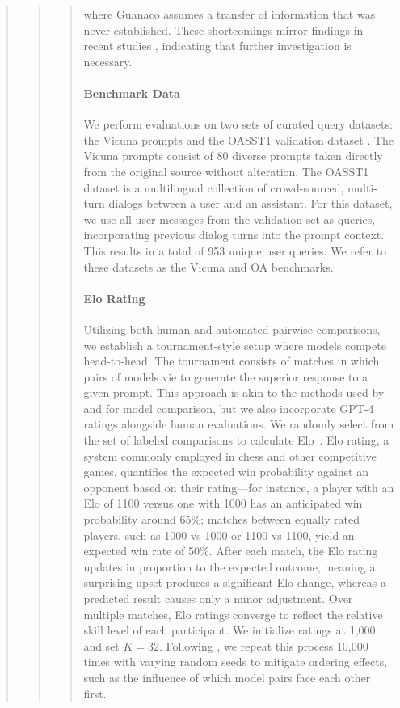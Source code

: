 \begin{quote}
\begin{quote}
\begin{quote}
where {Guanaco} assumes a transfer of information that was never established. These shortcomings mirror findings in recent studies \cite{sap2022neural}, indicating that further investigation is necessary.

\paragraph{Benchmark Data} We perform evaluations on two sets of curated query datasets: the Vicuna prompts \citep{vicuna2023} and the OASST1 validation dataset \citep{kopf2023openassistant}. The Vicuna prompts consist of 80 diverse prompts taken directly from the original source without alteration. The OASST1 dataset is a multilingual collection of crowd-sourced, multi-turn dialogs between a user and an assistant. For this dataset, we use all user messages from the validation set as queries, incorporating previous dialog turns into the prompt context. This results in a total of 953 unique user queries. We refer to these datasets as the Vicuna and OA benchmarks.

\paragraph{Elo Rating} Utilizing both human and automated pairwise comparisons, we establish a tournament-style setup where models compete head-to-head. The tournament consists of matches in which pairs of models vie to generate the superior response to a given prompt. This approach is akin to the methods used by \citet{bai2022training} and \citet{vicuna2023} for model comparison, but we also incorporate GPT-4 ratings alongside human evaluations. We randomly select from the set of labeled comparisons to calculate Elo~\citep{elo1967proposed,elo1978rating}. Elo rating, a system commonly employed in chess and other competitive games, quantifies the expected win probability against an opponent based on their rating—for instance, a player with an Elo of 1100 versus one with 1000 has an anticipated win probability around 65\%; matches between equally rated players, such as 1000 vs 1000 or 1100 vs 1100, yield an expected win rate of 50\%. After each match, the Elo rating updates in proportion to the expected outcome, meaning a surprising upset produces a significant Elo change, whereas a predicted result causes only a minor adjustment. Over multiple matches, Elo ratings converge to reflect the relative skill level of each participant. We initialize ratings at 1,000 and set $K=32$. Following \citet{vicuna2023}, we repeat this process 10,000 times with varying random seeds to mitigate ordering effects, such as the influence of which model pairs face each other first.


\end{quote}
\end{quote}
\end{quote}
